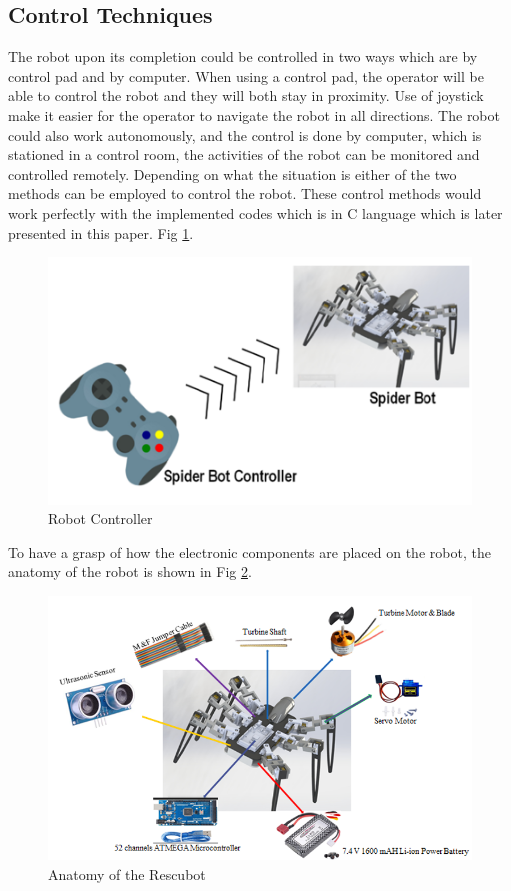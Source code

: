 \documentclass[10pt,journal,compsoc]{IEEEtran}
\begin{document}
\subsection{Control Techniques}

The robot upon its completion could be controlled in two ways which are by control pad and by computer. When using a control pad, the operator will be able to control the robot and they will both stay in proximity. Use of joystick make it easier for the operator to navigate the robot in all directions. The robot could also work autonomously, and the control is done by computer, which is stationed in a control room, the activities of the robot can be monitored and controlled remotely. Depending on what the situation is either of the two methods can be employed to control the robot. These control methods would work perfectly with the implemented codes which is in C language which is later presented in this paper. Fig \ref{fig:wireless}.


\begin{figure}[h]
\includegraphics[scale=0.73]{wireless}
\caption{Robot Controller}
\label{fig:wireless}
\end{figure}

To have a grasp of how the electronic components are placed on the robot, the anatomy of the robot is shown in Fig \ref{fig:anatomy}.



\begin{figure}[h]
\includegraphics[scale=0.48]{anatomy}
\caption{Anatomy of the Rescubot}
\label{fig:anatomy}
\end{figure}
\end{document}
